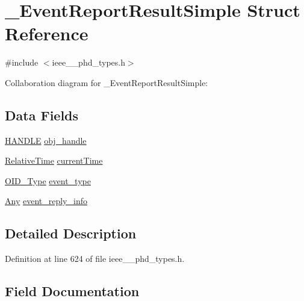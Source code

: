\hypertarget{struct___event_report_result_simple}{}\section{\+\_\+\+Event\+Report\+Result\+Simple Struct Reference}
\label{struct___event_report_result_simple}


{\ttfamily \#include $<$ieee\+\_\+\_\+phd\+\_\+types.\+h$>$}



Collaboration diagram for \+\_\+\+Event\+Report\+Result\+Simple\+:
\subsection*{Data Fields}
\begin{DoxyCompactItemize}
\item 
\hyperlink{ieee__11073__phd__types_8h_a76f0d44d294babf2e568f7ee676ffca6}{H\+A\+N\+D\+L\+E} \hyperlink{struct___event_report_result_simple_abbfff52b7a4956021522f5750c4b32c6}{obj\+\_\+handle}
\item 
\hyperlink{ieee__11073__phd__types_8h_a396922eed4599fd81cd463e5c941eb03}{Relative\+Time} \hyperlink{struct___event_report_result_simple_a1b89e4e0b29f44922e81ee52395349e2}{current\+Time}
\item 
\hyperlink{ieee__11073__phd__types_8h_aa4d7af235d4a95d6632aa0d64160dd62}{O\+I\+D\+\_\+\+Type} \hyperlink{struct___event_report_result_simple_a9291df89a9ec8bde547d68f86d3e6d75}{event\+\_\+type}
\item 
\hyperlink{ieee__11073__phd__types_8h_a4decf91c0c44a2ed84549e41307f5fdb}{Any} \hyperlink{struct___event_report_result_simple_ae0ca8de65064d283176bd4d1d2587db0}{event\+\_\+reply\+\_\+info}
\end{DoxyCompactItemize}


\subsection{Detailed Description}


Definition at line 624 of file ieee\+\_\+\_\+phd\+\_\+types.\+h.



\subsection{Field Documentation}
\hypertarget{struct___event_report_result_simple_a1b89e4e0b29f44922e81ee52395349e2}{}
